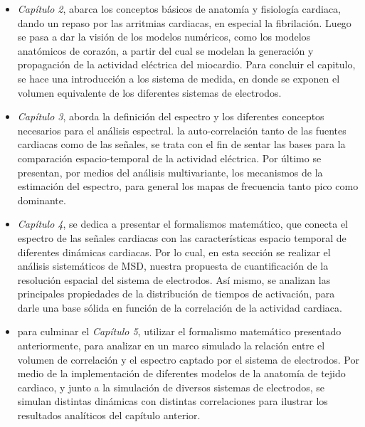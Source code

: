 \begin{itemize}
  \item \textit{Capítulo 2}, abarca los conceptos básicos de anatomía  y fisiología cardiaca, dando un repaso por las arritmias cardiacas, en especial
  la fibrilación. Luego se pasa a dar la visión de los modelos numéricos, como
  los modelos anatómicos de corazón, a partir del cual se modelan la
  generación y propagación de la actividad eléctrica del miocardio. Para concluir
  el capitulo, se hace una introducción a los sistema de medida, en donde se
  exponen el volumen equivalente de los diferentes sistemas de electrodos.

  \item \textit{Capítulo 3}, aborda la definición del espectro  y los diferentes
  conceptos necesarios para el análisis espectral. la auto-correlación tanto de
  las fuentes cardiacas como de las señales, se trata con el fin de  sentar las
  bases para la comparación espacio-temporal de la actividad eléctrica. Por
  último se presentan, por medios del análisis multivariante, los mecanismos de
  la estimación del espectro, para  general los mapas de frecuencia tanto pico
  como dominante.

  \item \textit{Capítulo 4}, se dedica a presentar el formalismos matemático,
  que conecta el espectro de las señales cardiacas con las características
  espacio temporal de diferentes dinámicas cardiacas. Por lo cual, en esta
  sección se realizar el análisis sistemáticos de \ac{MSD}, nuestra propuesta de
  cuantificación de la resolución espacial del sistema de electrodos. Así mismo,
  se analizan las principales propiedades de la distribución de tiempos de
  activación, para darle una base sólida en función de la correlación de la
  actividad cardiaca.

  \item para culminar  el \textit{Capítulo 5}, utilizar el formalismo matemático
  presentado anteriormente, para analizar en un marco simulado la relación entre
  el volumen de correlación y el espectro captado por el sistema de electrodos.
  Por medio de la implementación de diferentes modelos de la anatomía de tejido
  cardiaco, y junto a la simulación de diversos sistemas de electrodos, se
  simulan distintas dinámicas con distintas correlaciones  para ilustrar los
  resultados analíticos del capítulo anterior.

  \end{itemize}

